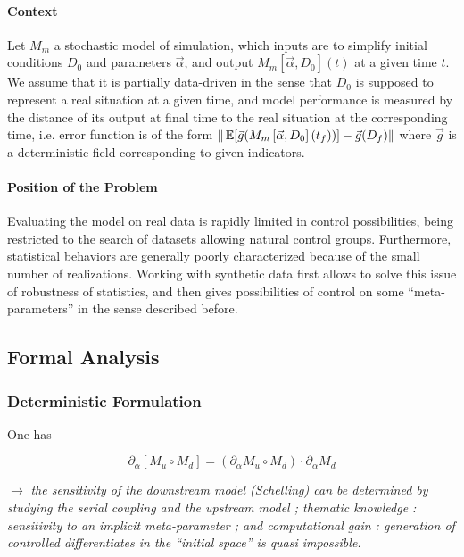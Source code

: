 \paragraph{Context}

Let $M_{m}$ a stochastic model of simulation, which inputs are to simplify initial conditions $D_0$ and parameters $\vec{\alpha}$, and output $M_{m}\left[\vec{\alpha},D_0\right](t)$ at a given time $t$. We assume that it is partially data-driven in the sense that $D_0$ is supposed to represent a real situation at a given time, and model performance is measured by the distance of its output at final time to the real situation at the corresponding time, i.e. error function is of the form $\| \operatorname{\mathbb{E}}\!\left[\vec{g}(M_{m}\left[\vec{\alpha},D_0\right](t_f))\right]-\vec{g}(D_f) \|$ where $\vec{g}$ is a deterministic field corresponding to given indicators.



\paragraph{Position of the Problem}

Evaluating the model on real data is rapidly limited in control possibilities, being restricted to the search of datasets allowing natural control groups. Furthermore, statistical behaviors are generally poorly characterized because of the small number of realizations. Working with synthetic data first allows to solve this issue of robustness of statistics, and then gives possibilities of control on some ``meta-parameters'' in the sense described before.




\subsection{Formal Analysis}

\subsubsection{Deterministic Formulation}

One has 

\[
\partial_{\alpha}\left[M_u \circ M_d\right] = \left(\partial_{\alpha} M_u \circ M_d \right)\cdot \partial_{\alpha} M_d
\]

$\rightarrow$ \textit{the sensitivity of the downstream model (Schelling) can be determined by studying the serial coupling and the upstream model ; thematic knowledge : sensitivity to an implicit meta-parameter ; and computational gain : generation of controlled differentiates in the ``initial space'' is quasi impossible.}

